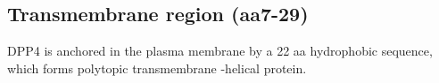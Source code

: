 \subsection{Transmembrane region (aa7-29)}

DPP4 is anchored in the plasma membrane by a 22 aa hydrophobic sequence, which forms polytopic transmembrane \alpha-helical protein. \cite{Hong_1990}